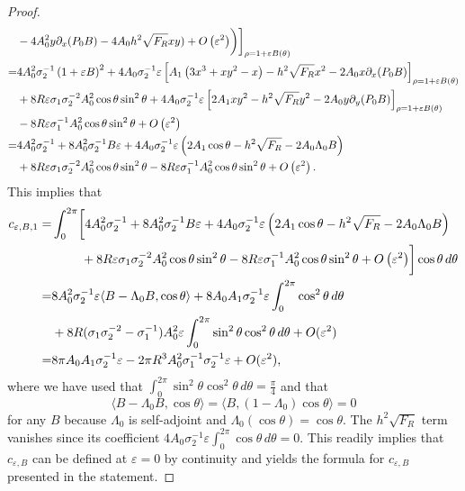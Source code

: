 \documentclass[12pt,reqno]{amsart}
\numberwithin{equation}{section}
\theoremstyle{definition}
\theoremstyle{remark}
\begin{document}
\begin{proof}
\begin{align}
&  -4 A_0^2 y \partial_x (P_0 B)  -4A_0h^2\sqrt{F_R}xy )+O\left(\varepsilon^2\right)\biggr)\bigg]_{\rho=1+\varepsilon B(\theta)} \notag\\
=&4  A_0^2\sigma_2^{-1}\left(1+\varepsilon B\right)^2+4 A_0 \sigma_2^{-1} \varepsilon\left[A_1\left(3 x^3+x y^2-x\right)-h^2\sqrt{F_R}x^2 -2 A_0x \partial_x(P_0 B)\right]_{\rho=1+\varepsilon B(\theta)}  \notag\\	
& +8 R \varepsilon \sigma_1 \sigma_2^{-2} A_0^2 \cos\theta\sin^2\theta+4 A_0 \sigma_2^{-1} \varepsilon\left[2 A_1 x y^2-h^2\sqrt{F_R}y^2-2A_0y \partial_y (P_0 B)\right]_{\rho=1+\varepsilon B(\theta)} \notag \\
& -8 R\varepsilon  \sigma_1^{-1} A_0^2\cos\theta\sin^2\theta    +O\left(\varepsilon^2\right) \notag\\
=& 4 A_0^2\sigma_2^{-1}+ 8 A_0^2 \sigma_2^{-1}B \varepsilon+4 A_0 \sigma_2^{-1} \varepsilon\left(2A_1\cos\theta-h^2\sqrt{F_R}-2A_0\Lambda_0 B \right)  \notag\\
& +8 R \varepsilon \sigma_1 \sigma_2^{-2} A_0^2 \cos\theta\sin^2\theta-8 R \varepsilon \sigma_1^{-1} A_0^2 \cos\theta\sin^2\theta+O\left(\varepsilon^2\right).
\end{align} 
This implies that 
	\begin{align*}%
c_{\varepsilon,B,1} =& \int_0^{2\pi} \biggl[4 A_0^2\sigma_2^{-1}+ 8 A_0^2\sigma_2^{-1} B \varepsilon+4 A_0 \sigma_2^{-1} \varepsilon\left(2A_1\cos\theta-h^2\sqrt{F_R}-2A_0\Lambda_0 B \right) \notag\\
&\ \ \ \ \ \ \  +8 R \varepsilon \sigma_1 \sigma_2^{-2} A_0^2 \cos\theta\sin^2\theta-8 R \varepsilon \sigma_1^{-1} A_0^2 \cos\theta\sin^2\theta+O\left(\varepsilon^2\right)\biggr]\cos\theta \,d\theta \notag\\
=	& 8 A_0^2\sigma_2^{-1} \varepsilon\langle B - \Lambda_0 B, \cos\theta\rangle
+ 8A_0 A_1\sigma_2^{-1}\varepsilon  \int_0^{2\pi} \cos^2\theta\,d\theta \notag\\
&+ 8R  (\sigma_1 \sigma_2^{-2}-\sigma_1^{-1}) A_0^2\varepsilon\int_0^{2\pi} \sin^2\theta\cos^2\theta\,d\theta + O(\varepsilon^2) \notag\\
=	& 8\pi A_0 A_1\sigma_2^{-1}\varepsilon-2\pi R^3 A_0^2\sigma_1^{-1}\sigma_2^{-1} \varepsilon+ O(\varepsilon^2) , 
	\end{align*}
	where we have used that $ \int_0^{2\pi} \sin^2\theta\cos^2\theta\,d\theta=\frac{\pi}{4} $ and that
	\[
	\langle B - \Lambda_0 B, \cos\theta\rangle
	= \langle B, (1-\Lambda_0)\cos\theta\rangle = 0
	\]
	for any $B$ because $\Lambda_0$ is self-adjoint and $\Lambda_0(\cos\theta)=\cos\theta$. The $ h^2\sqrt{F_R} $ term vanishes since its coefficient $ 4 A_0 \sigma_2^{-1} \varepsilon\int_0^{2\pi} \cos \theta\,d\theta=0. $ This readily implies that $c_{\varepsilon,B}$ can be defined at $\varepsilon=0$ by continuity and yields the formula for $c_{\varepsilon,B}$ presented in the statement.

\end{proof}
\end{document}

